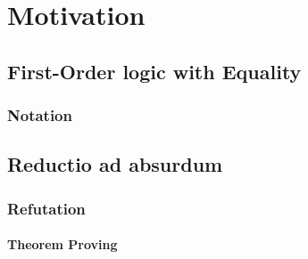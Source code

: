

\section{Motivation}

\subsection{First-Order logic with Equality}

\begin{frame}
	\frametitle{Notation}
%	
	
\end{frame}

\subsection{Reductio ad absurdum}

\begin{frame}
	\frametitle{Refutation}
	\framesubtitle{\FOL{}Theorem Proving}
	
\end{frame}

\begin{frame}
	
\end{frame}

\begin{frame}
	
	
\end{frame}

\begin{frame}
	
\end{frame}
	

